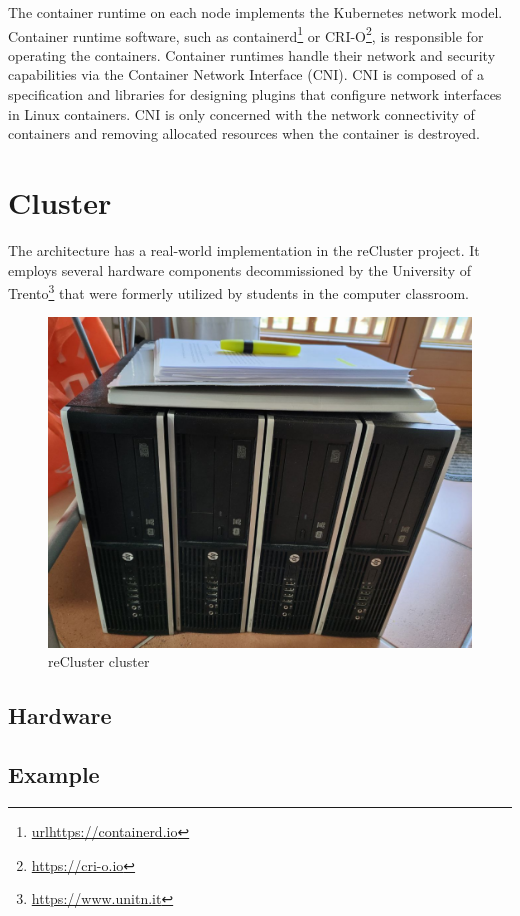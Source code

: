 The container runtime on each node implements the Kubernetes network model.
Container runtime software, such as containerd\footnote{\url{urlhttps://containerd.io}}
or CRI-O\footnote{\url{https://cri-o.io}}, is responsible for operating the
containers. Container runtimes handle their network and security capabilities via
the Container Network Interface (CNI)\cite{k8s_cluster_networking}\cite{k8s_networking_model}.
CNI is composed of a specification and libraries for designing plugins that
configure network interfaces in Linux containers. CNI is only concerned with the
network connectivity of containers and removing allocated resources when the container
is destroyed\cite{cni}.

\section{Cluster}
\label{sec:architecture_cluster}

The architecture has a real-world implementation in the reCluster project. It
employs several hardware components decommissioned by the University of Trento\footnote{\url{https://www.unitn.it}}
that were formerly utilized by students in the computer classroom.

\begin{figure}[htbp]
  \centering
  \includegraphics[width=.5\textwidth]{images/recluster/cluster.png}
  \caption{reCluster cluster}
\end{figure}

\subsection{Hardware}
\label{subsec:architecture_cluster_hardware}


\subsection{Example}
\label{subsec:architecture_cluster_example}

